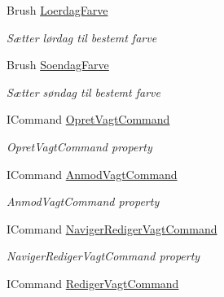 \begin{DoxyCompactItemize}
Brush \hyperlink{class__1aarsproeve_1_1_view_model_1_1_vagtplan_view_model_a185e3bddfb80d3f012af638b27bbf99a}{Loerdag\+Farve}
\begin{DoxyCompactList}\small\item\em Sætter lørdag til bestemt farve \end{DoxyCompactList}\item 
Brush \hyperlink{class__1aarsproeve_1_1_view_model_1_1_vagtplan_view_model_aa6afb148e3e73f41c510862b157affb0}{Soendag\+Farve}
\begin{DoxyCompactList}\small\item\em Sætter søndag til bestemt farve \end{DoxyCompactList}\item 
I\+Command \hyperlink{class__1aarsproeve_1_1_view_model_1_1_vagtplan_view_model_a76a5f40943fb46d05fdc59d4d786d206}{Opret\+Vagt\+Command}
\begin{DoxyCompactList}\small\item\em Opret\+Vagt\+Command property \end{DoxyCompactList}\item 
I\+Command \hyperlink{class__1aarsproeve_1_1_view_model_1_1_vagtplan_view_model_a470dc3d93a55c5ff2f1f31f9f3ff6097}{Anmod\+Vagt\+Command}
\begin{DoxyCompactList}\small\item\em Anmod\+Vagt\+Command property \end{DoxyCompactList}\item 
I\+Command \hyperlink{class__1aarsproeve_1_1_view_model_1_1_vagtplan_view_model_ae4dd8a49f04a9a86d11a08900877864d}{Naviger\+Rediger\+Vagt\+Command}
\begin{DoxyCompactList}\small\item\em Naviger\+Rediger\+Vagt\+Command property \end{DoxyCompactList}\item 
I\+Command \hyperlink{class__1aarsproeve_1_1_view_model_1_1_vagtplan_view_model_ae296ae21658d307b305116426c0e114e}{Rediger\+Vagt\+Command}

\end{DoxyCompactItemize}
